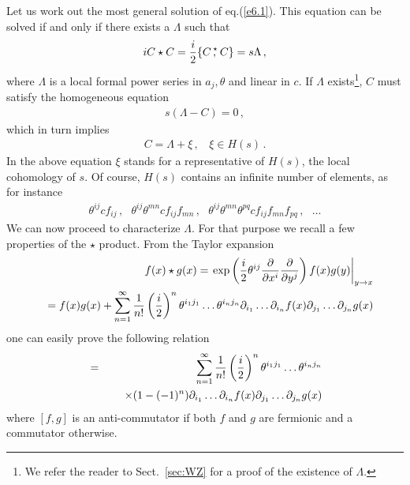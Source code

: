 \documentclass[a4paper,12pt]{article}
\def\back{\!\!\!\!\!\!\!\!\!}
\newcommand{\staranticomm}[2]{\{ #1 \, ,^{\!\!\star} #2 \}}
\begin{document}
Let us work out the most general solution of eq.(\ref{e6.1}). 
This equation  can be solved if and only if there exists a $\Lambda$ such that
%
\begin{eqnarray}
 i C \star C = {i \over 2} \staranticomm{C}{C} = s \Lambda  \, ,
\label{e11}
\end{eqnarray}
%
where $\Lambda$ is a local formal power series in  $a_j,\theta$ and linear
 in $c$.
If $\Lambda$ exists\footnote{We refer the reader to Sect.~\ref{sec:WZ}
 for a proof of the existence of $\Lambda$.}, $C$ must satisfy the homogeneous
 equation
%
\begin{eqnarray}
s ( \Lambda - C) = 0 \, ,
\label{e12}
\end{eqnarray}
%
which in turn implies
%
\begin{eqnarray}
C = \Lambda + \xi \, , ~~~~ \xi \in H(s) \, .
\label{e13}
\end{eqnarray}
%
In the above equation $\xi$ stands for a representative of $H(s)$, the
 local cohomology of $s$. Of course, $H(s)$ contains an infinite number of
 elements, as for instance  
%
\begin{eqnarray}
\theta^{ij} c f_{ij}\, , ~~~
\theta^{ij} \theta^{mn} c f_{ij} f_{mn} \, , ~~~
\theta^{ij} \theta^{mn} \theta^{pq} c f_{ij} f_{mn} f_{pq}  \, , ~~~\dots
\label{e14}
\end{eqnarray}
%
We can now proceed to characterize $\Lambda$.
For that purpose we recall a few properties of the $\star$ product.
From the Taylor expansion
%
\begin{eqnarray}
&&\back
f(x) \star g(x)  =  \left . \exp \left( {i \over 2} \theta^{ij} {\partial \over \partial x^i}
{\partial \over \partial y^j} \right) f(x) g(y) \right |_{y \rightarrow x} 
\nonumber \\
&& =  f(x)g(x) + \sum_{n=1}^\infty
{1 \over n!}  \left ( {i \over 2} \right )^n \theta^{i_1 j_1} \dots
\theta^{i_n j_n} \partial_{i_1} \dots \partial_{i_n} f(x) 
                 \partial_{j_1} \dots \partial_{j_n} g(x)
\label{e15}
\end{eqnarray}
%
one can easily prove the following relation
%
\begin{eqnarray}
[ f(x) \, ,^{\!\!\star} g(x) ] &=& 
\sum_{n=1}^\infty{1 \over n!} \left ( {i \over 2} \right )^{n}
 \theta^{i_1 j_1} \dots
\theta^{i_{n} j_{n}}\nonumber\\
&&~~~~\times (1-(-1)^n)  \partial_{i_1} \dots \partial_{i_{n}} f(x) 
                 \partial_{j_1} \dots \partial_{j_{n}} g(x)
\label{e16}
\end{eqnarray}
%
where $[f,g]$ is an anti-commutator if both $f$ and $g$ are fermionic
 and a commutator otherwise.
\end{document}
